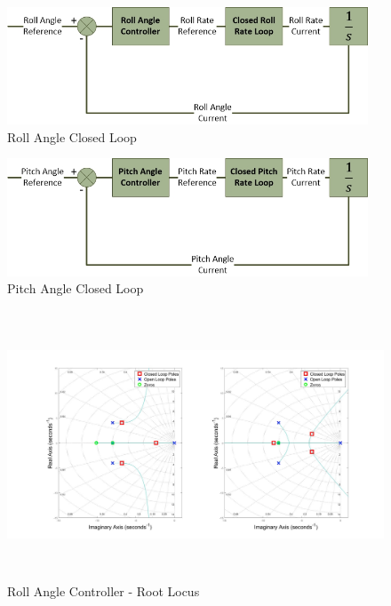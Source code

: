 		\begin{figure}[H]
			\centering
			\includegraphics[height = 3.5cm]{../References/Diagrams/RollAngleLoop.jpg}
			\caption{Roll Angle Closed Loop}
			\label{IM_RollAngleLoop}
		\end{figure}
		
		\begin{figure}[H]
			\centering
			\includegraphics[height = 3.5cm]{../References/Diagrams/PitchAngleLoop.jpg}
			\caption{Pitch Angle Closed Loop}
			\label{IM_PitchAngleLoop}
		\end{figure}
		
		\begin{figure}[H]
			\centering
			\includegraphics[height = 8cm]{../Design/Matlab/Controllers/roll_angle_root.jpg}
			\caption{Roll Angle Controller -  Root Locus}
			\label{IM_RollAngleControlRoot}
		\end{figure}
		
